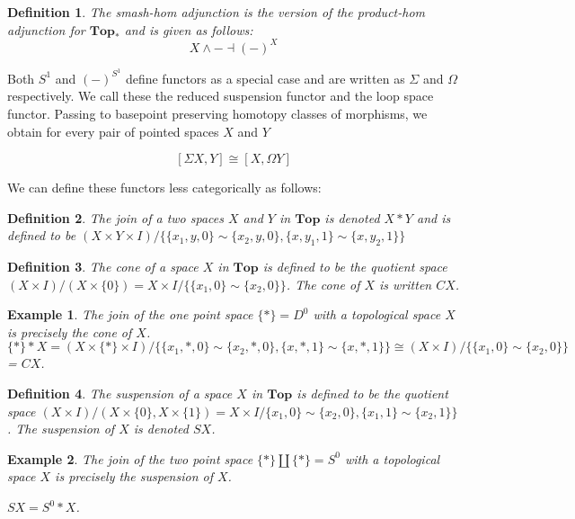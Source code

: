 \documentclass{article}
\theoremstyle{problemstyle}
\theoremstyle{problemstyle}
\newtheorem{definition}{Definition}
\theoremstyle{problemstyle}
\newtheorem{example}{Example}
\theoremstyle{problemstyle}
\theoremstyle{problemstyle}
\theoremstyle{problemstyle}
\begin{document}
\begin{definition}
The smash-hom adjunction is the version of the product-hom adjunction for $\textbf{Top}_*$ and is given as follows:
$$X \wedge - \dashv (-)^X$$
\end{definition}

Both $S^1$ and $(-)^{S^1}$ define functors as a special case and are written as $\Sigma$ and $\Omega$ respectively. We call these the reduced suspension functor and the loop space functor. Passing to basepoint preserving homotopy classes of morphisms, we obtain for every pair of pointed spaces $X$ and $Y$

$$[\Sigma X, Y] \cong [X, \Omega Y]$$

We can define these functors less categorically as follows:

\begin{definition}
The join of a two spaces $X$ and $Y$ in $\textbf{Top}$ is denoted $X * Y$ and is defined to be $(X \times Y \times I)/ \{\{x_1, y, 0\} \sim \{x_2, y, 0\}, \{x, y_1,1\} \sim \{x, y_2, 1\}\}$
\end{definition}

\begin{definition}
The cone of a space $X$ in $\textbf{Top}$ is defined to be the quotient space $(X\times I)/(X \times\{0\}) = X \times I / \{\{x_1, 0\} \sim \{x_2, 0\}\}$. The cone of $X$ is written $CX$. 
\end{definition}

\begin{example}
The join of the one point space $\{*\} = D^0$ with a topological space $X$ is precisely the cone of $X$.\\
$\{*\}*X = (X \times \{*\} \times I)/ \{\{x_1, *, 0\} \sim \{x_2, *, 0\}, \{x, *,1\} \sim \{x, *, 1\}\} \cong (X \times I) / \{\{x_1, 0\} \sim \{x_2, 0\}\}$ = $CX$.
\end{example}

\begin{definition}
The suspension of a space $X$ in $\textbf{Top}$ is defined to be the quotient space $(X\times I)/(X \times\{0\}, X \times \{1\}) = X \times I / \{x_1,0\}\sim \{x_2,0\},\{x_1,1\} \sim \{x_2,1\}\}$. The suspension of $X$ is denoted $SX$.
\end{definition}

\begin{example}
The join of the two point space $\{*\}\coprod \{*\} = S^0$ with a topological space $X$ is precisely the suspension of $X$.

$SX = S^0 * X$. 
\end{example}
\end{document}
